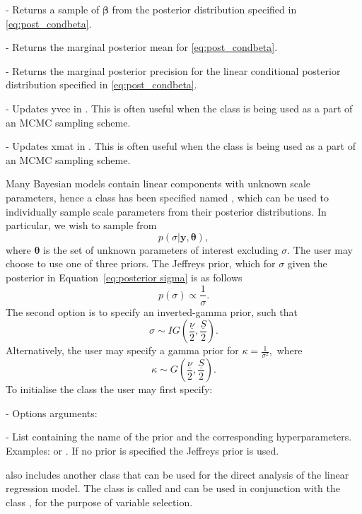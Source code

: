 \documentclass[article]{jss}
\begin{document}
\begin{description}

\item {} - Returns a sample of $\bm{\beta}$ from the
  posterior distribution specified in \ref{eq:post_condbeta}.
\item {} - Returns the marginal
  posterior mean for \ref{eq:post_condbeta}.
\item {} - Returns the
  marginal posterior precision for the linear conditional posterior
  distribution specified in \ref{eq:post_condbeta}.
\item {} - Updates yvec in
  . This is often useful when the class is
  being used as a part of an MCMC sampling scheme.
\item {} - Updates xmat in
  . This is often useful when the class is
  being used as a part of an MCMC sampling scheme.
\end{description}
Many Bayesian models contain linear components with unknown scale
parameters, hence a class has been specified named
, which can be used to individually sample
scale parameters from their posterior distributions. In particular, we
wish to sample from
\begin{equation} p(\sigma|\bm{y},\bm{\theta}),\label{eq:posterior
    sigma}
\end{equation} where $\bm{\theta}$ is the set of unknown
parameters of interest excluding $\sigma.$ The user may choose to use
one of three priors.  The Jeffreys prior, which for $\sigma$ given
the posterior in Equation~\ref{eq:posterior sigma} is as follows \[
p(\sigma)\propto\frac{1}{\sigma}.\] The second option is to specify an
inverted-gamma prior, such that\[ \sigma\sim
IG\left(\frac{\underline{\nu}}{2},\frac{\underline{S}}{2}\right).\]
Alternatively, the user may specify a gamma prior for
$\kappa=\frac{1}{\sigma^{2}},$ where\[ \kappa\sim
G\left(\frac{\underline{\nu}}{2},\frac{\underline{S}}{2}\right).\] To
initialise the class  the user may first
specify:
\begin{description}
\item {} - Options arguments:
\begin{description}
\item {} - List containing the name of the prior and the
  corresponding hyperparameters. Examples: \newline
   or \newline
  . If no prior is
  specified the Jeffreys prior is used.
\end{description}
\end{description}
 also includes another class that can be used for the
direct analysis of the linear regression model. The class is called
 and can be used in conjunction with the class
, for the purpose of variable selection.
\end{document}
